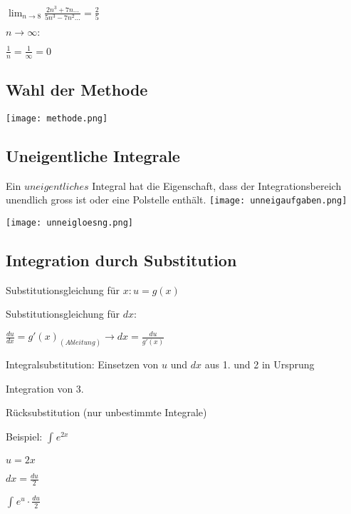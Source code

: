 \begin{multicols*}{3}
    {\large $  \lim_{n\to 8} \frac{2n^3+7n...}{5n^3-7n^2...} = \frac{2}{5}$}
    \WhiteSpace

    {$n \to \infty:$}

    {\large  $ \frac{1}{n} = \frac{1}{\infty} = 0$}
    \WhiteSpace




    \subsection{Wahl der Methode}

    \texttt{[image: methode.png]}

    \subsection{Uneigentliche Integrale}
    { Ein $uneigentliches$ Integral hat die Eigenschaft, dass der Integrationsbereich unendlich gross
        ist oder eine Polstelle enthält.}
    \texttt{[image: unneigaufgaben.png]}

    \texttt{[image: unneigloesng.png]}



    \vfill\null
    \columnbreak
    \subsection{Integration durch Substitution}
    { Substitutionsgleichung für $x: u = g(x)$}

    { Substitutionsgleichung für $dx:$}

    $ \frac{du}{dx} = g'(x)_{(Ableitung)} \to dx = \frac{du}{g'(x)}$

    { Integralsubstitution: Einsetzen von $ u $ und $ dx $ aus 1. und 2 in Ursprung}

        { Integration von 3.}

        { Rücksubstitution (nur unbestimmte Integrale)}


    \begin{multicols*}{2}
        {Beispiel:}
        $\int_{}^{}e^{2x} $

        \columnbreak

        { $ u = 2x $}

        { $ dx = \frac{du}{2} $}

        { $ \int_{}{}e^u \cdot  \frac{du}{2} $}

    \end{multicols*}


\end{multicols*}
